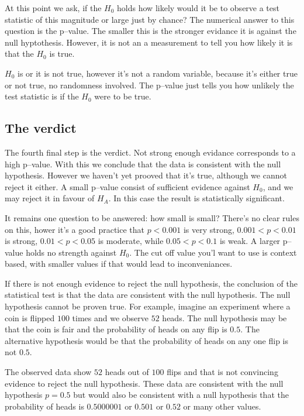 At this point we ask, if the $H_0$ holds how likely would it be to observe a
test statistic of this magnitude or large just by chance? The numerical answer
to this question is the p--value. The smaller this is the stronger evidance it
is against the null hyptothesis. However, it is not an a measurement to tell you
how likely it is that the $H_0$ is true.

$H_0$ is or it is not true, however it's not a random variable, because it's
either true or not true, no randomness involved. The p--value just tells you how
unlikely the test statistic is if the $H_0$ were to be true.

\subsection{The verdict}

The fourth final step is the verdict. Not strong enough evidance corresponds to
a high p--value. With this we conclude that the data is consistent with the null
hypothesis. However we haven't yet prooved that it's true, although we cannot
reject it either. A small p--value consist of sufficient evidence against $H_0$,
and we may reject it in favour of $H_A$. In this case the result is
statistically significant.

It remains one question to be answered: how small is small? There's no clear
rules on this, hower it's a good practice that $p<0.001$ is very strong, $0.001
< p < 0.01$ is strong, $0.01 < p < 0.05$ is moderate, while $0.05 < p < 0.1$ is
weak. A larger p--value holds no strength against $H_0$. The cut off value you'l
want to use is context based, with smaller values if that would lead to
inconveniances.

If there is not enough evidence to reject the null hypothesis, the conclusion of
the statistical test is that the data are consistent with the null hypothesis.
The null hypothesis cannot be proven true. For example, imagine an experiment
where a coin is flipped $100$ times and we observe $52$ heads. The null
hypothesis may be that the coin is fair and the probability of heads on any flip
is $0.5$.
The alternative hypothesis would be that the probability of heads on any one
flip is not $0.5$.

The observed data show $52$ heads out of $100$ flips and that is not convincing
evidence to reject the null hypothesis. These data are consistent with the null
hypothesis $p=0.5$ but would also be consistent with a null hypothesis that the
probability of heads is $0.5000001$ or $0.501$ or $0.52$ or many other values.

